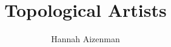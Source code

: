 \documentclass[letterpaper,onecolumn,titlepage]{Ythesis}
\title{Topological Artists}
\author{Hannah Aizenman}
\newcommand{\note}[1]{\textcolor{Magenta}{#1}}
\begin{document}
\makefrontmatter




\printbibliography
\end{document}
